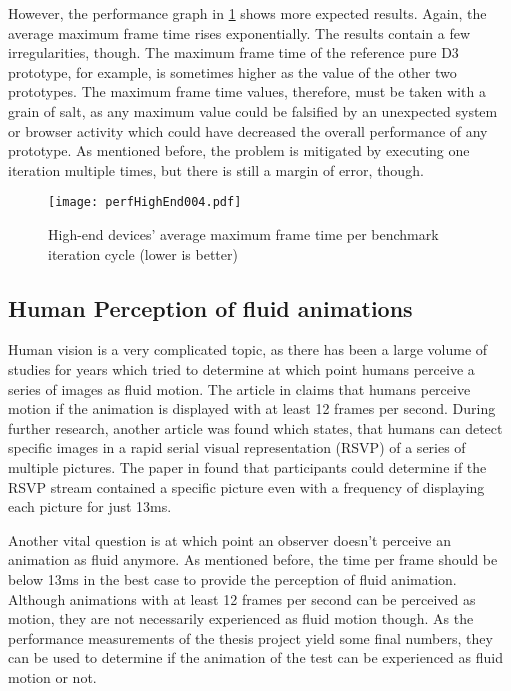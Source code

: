 However, the performance graph in \ref{fig:perfHighEnd004} shows more expected results. Again, the average maximum frame time rises exponentially. The results contain a few irregularities, though. The maximum frame time of the reference pure D3 prototype, for example, is sometimes higher as the value of the other two prototypes. The maximum frame time values, therefore, must be taken with a grain of salt, as any maximum value could be falsified by an unexpected system or browser activity which could have decreased the overall performance of any prototype. As mentioned before, the problem is mitigated by executing one iteration multiple times, but there is still a margin of error, though.

\begin{figure}
\centering
\texttt{[image: perfHighEnd004.pdf]}
\caption{High-end devices' average maximum frame time per benchmark iteration cycle (lower is better)}
\label{fig:perfHighEnd004}
\end{figure}

\subsection{Human Perception of fluid animations}
\label{sub:humanPerception}


Human vision is a very complicated topic, as there has been a large volume of studies for years which tried to determine at which point humans perceive a series of images as fluid motion. The article in \cite{RestorationOfMotionPictureFilm} claims that humans perceive motion if the animation is displayed with at least 12 frames per second. During further research, another article was found which states, that humans can detect specific images in a rapid serial visual representation (RSVP) of a series of multiple pictures. The paper in \cite{Potter2014} found that participants could determine if the RSVP stream contained a specific picture even with a frequency of displaying each picture for just 13ms. 

Another vital question is at which point an observer doesn't perceive an animation as fluid anymore. As mentioned before, the time per frame should be below 13ms in the best case to provide the perception of fluid animation. Although animations with at least 12 frames per second can be perceived as motion, they are not necessarily experienced as fluid motion though. As the performance measurements of the thesis project yield some final numbers, they can be used to determine if the animation of the test can be experienced as fluid motion or not.

